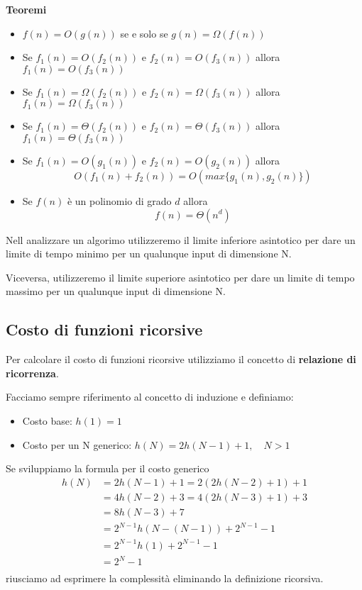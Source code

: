 \documentclass{article}
\begin{document}
\noindent\textbf{Teoremi}
\begin{itemize}
    \item \(f(n) = O\left(g(n)\right)\) se e solo se \(g(n) = \Omega\left(f(n)\right)\)
    \item Se \(f_1(n) = O\left(f_2(n)\right)\) e \(f_2(n) = O\left(f_3(n)\right)\) allora \(f_1(n) = O\left(f_3 (n)\right)\)
    \item Se \(f_1(n) = \Omega\left(f_2(n)\right)\) e \(f_2(n) = \Omega\left(f_3(n)\right)\) allora \(f_1(n) = \Omega\left(f_3 (n)\right)\)
    \item Se \(f_1(n) = \Theta\left(f_2(n)\right)\) e \(f_2(n) = \Theta\left(f_3(n)\right)\) allora \(f_1(n) = \Theta\left(f_3 (n)\right)\)
    \item Se \(f_1(n) = O\left(g_1(n)\right)\) e \(f_2(n) = O\left(g_2(n)\right)\) allora \[O\left(f_1(n) + f_2(n)\right) = O\left(max\{g_1(n), g_2(n)\}\right)\]
    \item Se \(f(n)\) è un polinomio di grado \(d\) allora \[f(n) = \Theta\left(n^d\right)\]
\end{itemize}

Nell analizzare un algorimo utilizzeremo il limite inferiore asintotico per dare un limite di tempo minimo per un qualunque input di dimensione N.

Viceversa, utilizzeremo il limite superiore asintotico per dare un limite di tempo massimo per un qualunque input di dimensione N.

\subsection{Costo di funzioni ricorsive}
Per calcolare il costo di funzioni ricorsive utilizziamo il concetto di \textbf{relazione di ricorrenza}.

Facciamo sempre riferimento al concetto di induzione e definiamo:
\begin{itemize}
    \item Costo base: \(h(1) = 1\)
    \item Costo per un N generico: \(h(N) = 2h(N - 1) + 1,\quad N > 1\)
\end{itemize}

Se sviluppiamo la formula per il costo generico
\begin{align*}
    h(N) &= 2h(N - 1) + 1 = 2(2h(N - 2) + 1) + 1 \\
         &= 4h(N - 2) + 3 = 4(2h(N - 3) + 1) + 3 \\
         &= 8h(N - 3) + 7 \\
         &= 2^{N-1}h\left(N - (N - 1)\right) + 2^{N-1} - 1 \\
         &= 2^{N-1}h(1) + 2^{N-1} - 1 \\
         &= 2^{N} - 1\\
\end{align*}
riusciamo ad esprimere la complessità eliminando la definizione ricorsiva.
\end{document}
